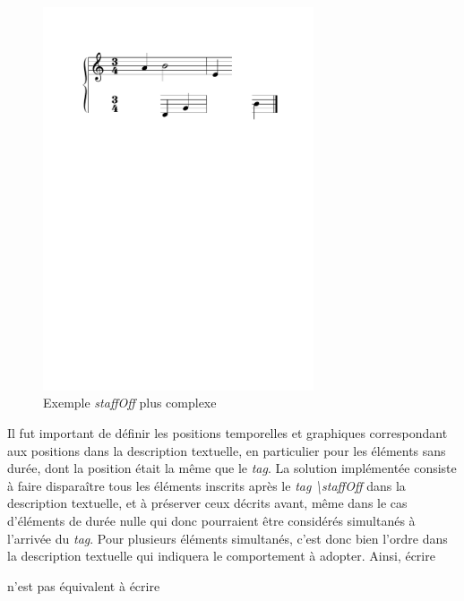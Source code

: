 \documentclass{article}
\newenvironment{gmncode}	{\vspace{-2mm}\small\verbatim}{\endverbatim\vspace{-2mm}}
\begin{document}

\begin{figure}[h]
\centering
\includegraphics[width=8cm]{img/staffoffexotique.pdf}
\caption{ Exemple \emph{staffOff} plus complexe}
\label{fig:staffoffexotique}
\end{figure}

Il fut important de définir les positions temporelles et graphiques correspondant aux positions dans la description textuelle, en particulier pour les éléments sans durée, dont la position était la même que le \emph{tag}. La solution implémentée consiste à faire disparaître tous les éléments inscrits après le \emph{tag} \emph{\textbackslash{}staffOff} dans la description textuelle, et à préserver ceux décrits avant, même dans le cas d'éléments de durée nulle qui donc pourraient être considérés simultanés à l'arrivée du \emph{tag}. Pour plusieurs éléments simultanés, c'est donc bien l'ordre dans la description textuelle qui indiquera le comportement à adopter. Ainsi, écrire 

\begin{center}
\begin{gmncode}
[\meter<"4/4">\clef\staffOff a b\staffOn c]
\end{gmncode}
\bigskip

n'est pas équivalent à écrire 
\\
\begin{gmncode}
[\staffOff\meter<"4/4">\clef a b\staffOn c]
\end{gmncode} 
\end{center}
\end{document}
